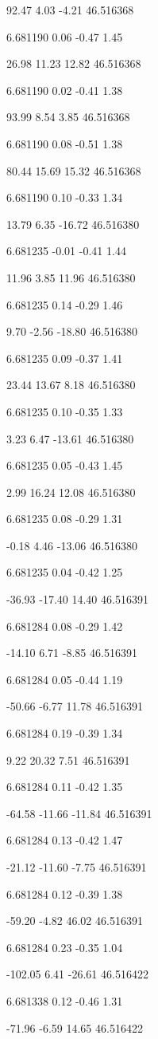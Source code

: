 92.47
4.03
-4.21
46.516368

6.681190
0.06
-0.47
1.45

26.98
11.23
12.82
46.516368

6.681190
0.02
-0.41
1.38

93.99
8.54
3.85
46.516368

6.681190
0.08
-0.51
1.38

80.44
15.69
15.32
46.516368

6.681190
0.10
-0.33
1.34

13.79
6.35
-16.72
46.516380

6.681235
-0.01
-0.41
1.44

11.96
3.85
11.96
46.516380

6.681235
0.14
-0.29
1.46

9.70
-2.56
-18.80
46.516380

6.681235
0.09
-0.37
1.41

23.44
13.67
8.18
46.516380

6.681235
0.10
-0.35
1.33

3.23
6.47
-13.61
46.516380

6.681235
0.05
-0.43
1.45

2.99
16.24
12.08
46.516380

6.681235
0.08
-0.29
1.31

-0.18
4.46
-13.06
46.516380

6.681235
0.04
-0.42
1.25

-36.93
-17.40
14.40
46.516391

6.681284
0.08
-0.29
1.42

-14.10
6.71
-8.85
46.516391

6.681284
0.05
-0.44
1.19

-50.66
-6.77
11.78
46.516391

6.681284
0.19
-0.39
1.34

9.22
20.32
7.51
46.516391

6.681284
0.11
-0.42
1.35

-64.58
-11.66
-11.84
46.516391

6.681284
0.13
-0.42
1.47

-21.12
-11.60
-7.75
46.516391

6.681284
0.12
-0.39
1.38

-59.20
-4.82
46.02
46.516391

6.681284
0.23
-0.35
1.04

-102.05
6.41
-26.61
46.516422

6.681338
0.12
-0.46
1.31

-71.96
-6.59
14.65
46.516422

